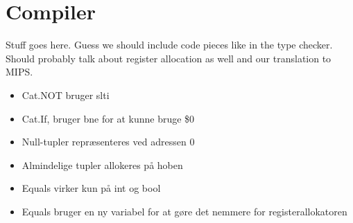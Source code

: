 \chapter{Compiler}
Stuff goes here. Guess we should include code pieces like in the
type checker. Should probably talk about register allocation as well and
our translation to MIPS.

\begin{itemize}
\item Cat.NOT bruger slti
\item Cat.If, bruger bne for at kunne bruge \$0
\item Null-tupler repræsenteres ved adressen 0
\item Almindelige tupler allokeres på hoben
\item Equals virker kun på int og bool
\item Equals bruger en ny variabel for at gøre det nemmere for registerallokatoren
\end{itemize}
